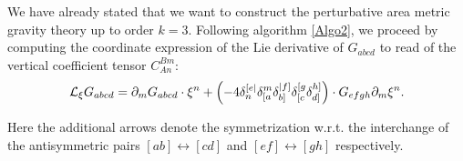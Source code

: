 We have already stated that we want to construct the perturbative area metric gravity theory up to order $k=3$. Following algorithm \ref{Algo2}, we proceed by computing the coordinate expression of the Lie derivative of $G_{abcd}$ to read of the vertical coefficient tensor $C_{An}^{Bm}$:
\begin{align}\label{LieArea}
    \mathcal{L}_{\xi} G_{abcd} = \partial_m G_{abcd} \cdot \xi^n + \left (-4 \delta_n^{[e\vert} \delta_{[\mathnode{a}}^m \delta_{b]}^{\vert \mathnode{f} ]} \delta_{[c}^{[g} \delta_{\mathnode{d}]}^{\mathnode{h}]} \right ) \cdot G_{efgh} \partial_m \xi^n.
\end{align}

Here the additional arrows denote the symmetrization w.r.t. the interchange of the antisymmetric pairs $[ab] \leftrightarrow [cd]$ and $[ef] \leftrightarrow [gh]$ respectively.

